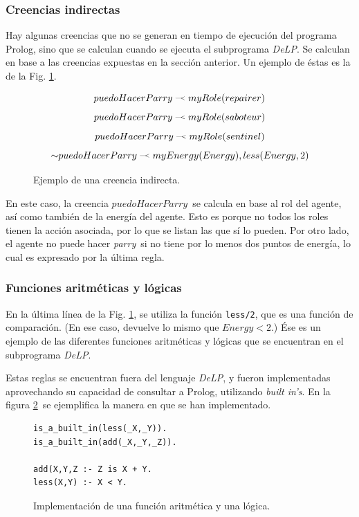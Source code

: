 \documentclass[oneside]{book}
\theoremstyle{definition}
\newcommand{\DLP}{\mbox{\textit{DeLP}}}
\newcommand{\no}{\mbox{$\sim$}}
\newcommand{\lit}[1]{\mbox{$ #1$}}
\newcommand{\drule}[2]{\mbox{$ #1\; \defleftarrow \; #2$}}
\newcommand{\defleftarrow}{{\raise1.5pt\hbox{\tiny\defleft}}}
\newcommand{\defleft}{\mbox{---\hspace{-1.5pt}\raise.05pt\hbox{$<$}}}
\newcommand{\nlA}[1]{$$\mbox{#1}$$}
\begin{document}
\subsubsection{Creencias indirectas}

\label{sec:creeciasIndirectas}

Hay algunas creencias que no se generan en tiempo de ejecución del programa Prolog, sino
que se calculan cuando se ejecuta el subprograma \DLP. Se calculan en base a las creencias
expuestas en la sección anterior. Un ejemplo de éstas es la de la Fig. 
\ref{fig:creenciaIndirecta}.

\begin{figure}[h]

\nlA{\drule{puedoHacerParry}{myRole(repairer)}}
\nlA{\drule{puedoHacerParry}{myRole(saboteur)}}
\nlA{\drule{puedoHacerParry}{myRole(sentinel)}}
\nlA{\drule{\no puedoHacerParry}{myEnergy(Energy), less(Energy,2)}}


\caption{Ejemplo de una creencia indirecta.}
\label{fig:creenciaIndirecta}

\end{figure}

En este caso, la creencia \lit{puedoHacerParry}\ se calcula en base al rol del 
agente,
así como también de la energía del agente. Esto es porque no todos los roles tienen la
acción asociada, por lo que se listan las que sí lo pueden. Por otro lado, el agente
no puede hacer \textit{parry}\ si no tiene por lo menos dos puntos de energía, lo cual
es expresado por la última regla.

\subsubsection{Funciones aritméticas y lógicas}

En la última línea de la Fig. \ref{fig:creenciaIndirecta}, se utiliza la función 
\texttt{less/2}, que es una función de comparación. (En ese caso, devuelve lo mismo
que $Energy < 2$.) Ése es un ejemplo de las diferentes funciones aritméticas y 
lógicas que se encuentran en el subprograma \DLP.

Estas reglas se encuentran fuera del lenguaje \DLP, y fueron implementadas 
aprovechando su capacidad de consultar a Prolog, utilizando \textit{built in's}.
En la figura \ref{fig:funciones}\ se ejemplifica la manera en que se han 
implementado.

\begin{figure}[h]
\begin{verbatim}    
is_a_built_in(less(_X,_Y)).
is_a_built_in(add(_X,_Y,_Z)).

add(X,Y,Z :- Z is X + Y.
less(X,Y) :- X < Y.
\end{verbatim}

\caption{Implementación de una función aritmética y una lógica.}
\label{fig:funciones}
\end{figure}
\end{document}
